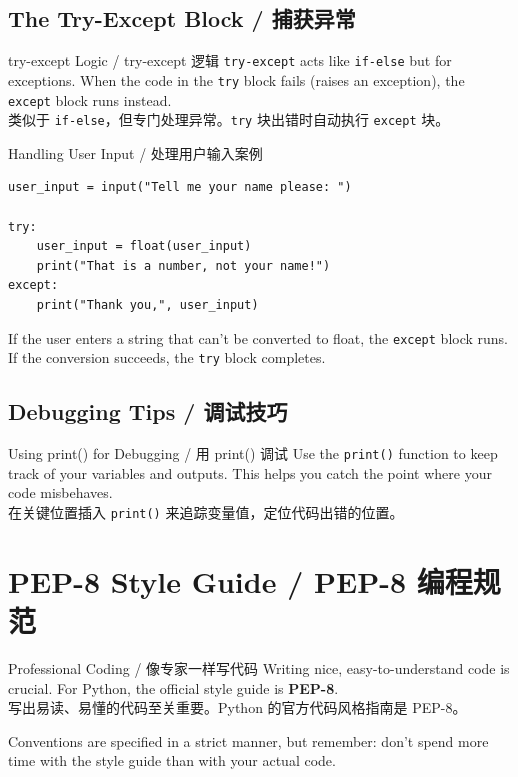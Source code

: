 \documentclass[11pt,a4paper]{article}
\begin{document}
\subsection{The Try-Except Block / 捕获异常}

\begin{concept}{try-except Logic / try-except 逻辑}
    \texttt{try-except} acts like \texttt{if-else} but for exceptions. When the code in the \texttt{try} block fails (raises an exception), the \texttt{except} block runs instead. \\
    类似于 \texttt{if-else}，但专门处理异常。\texttt{try} 块出错时自动执行 \texttt{except} 块。
\end{concept}

\begin{examplebox}{Handling User Input / 处理用户输入案例}
\begin{lstlisting}
user_input = input("Tell me your name please: ")

try:
    user_input = float(user_input)
    print("That is a number, not your name!")
except:
    print("Thank you,", user_input)
\end{lstlisting}
    If the user enters a string that can't be converted to float, the \texttt{except} block runs. If the conversion succeeds, the \texttt{try} block completes.
\end{examplebox}

\subsection{Debugging Tips / 调试技巧}

\begin{concept}{Using print() for Debugging / 用 print() 调试}
    Use the \texttt{print()} function to keep track of your variables and outputs. This helps you catch the point where your code misbehaves. \\
    在关键位置插入 \texttt{print()} 来追踪变量值，定位代码出错的位置。
\end{concept}

\section{PEP-8 Style Guide / PEP-8 编程规范}

\begin{concept}{Professional Coding / 像专家一样写代码}
    Writing nice, easy-to-understand code is crucial. For Python, the official style guide is \textbf{PEP-8}. \\
    写出易读、易懂的代码至关重要。Python 的官方代码风格指南是 PEP-8。

    Conventions are specified in a strict manner, but remember: don't spend more time with the style guide than with your actual code.
\end{concept}
\end{document}
